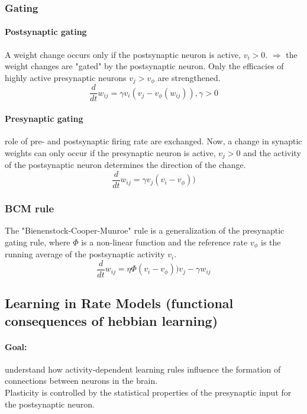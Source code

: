 \documentclass[11pt]{article}
\begin{document}
\subsubsection{Gating}
\paragraph{Postsynaptic gating} A weight change occurs only if the postsynaptic neuron is active, $v_i>0$. $\Rightarrow$ the weight changes are "gated" by the postsynaptic neuron. Only the efficacies of highly active presynaptic neurons $v_j>v_{\phi}$ are strengthened.
\[
\frac{d}{dt}w_{ij}=\gamma v_i(v_j-v_{\phi}(w_{ij})), \gamma>0
\]
\paragraph{Presynaptic gating} role of pre- and postsynaptic firing rate are exchanged. Now, a change in synaptic weights can only occur if the presynaptic neuron is active, $v_j>0$ and the activity of the postsynaptic neuron determines the direction of the change.
\[
\frac{d}{dt}w_{ij}=\gamma v_j(v_i-v_{\phi}))
\]

\subsubsection{BCM rule}
The "Bienenstock-Cooper-Munroe" rule is a generalization of the presynaptic gating rule, where $\Phi$ is a non-linear function and the reference rate $v_\phi$ is the running average of the postsynaptic activity $v_i$. 
\[
\frac{d}{dt}w_{ij}=\eta \Phi(v_i-v_{\phi}))v_j-\gamma w_{ij}
\]
\subsection{Learning in Rate Models (functional consequences of hebbian learning)}
\paragraph{Goal:} understand how activity-dependent learning rules influence the formation of connections between neurons in the brain.\\
Plasticity is controlled by the statistical properties of the presynaptic input for the postsynaptic neuron.
\end{document}
